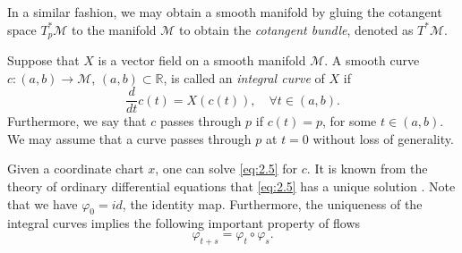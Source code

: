 In a similar fashion, we may obtain a smooth manifold by gluing the cotangent space $T^*_p \mathcal M$ to the manifold $\mathcal M$ to obtain the \emph{cotangent bundle}, denoted as $T^* \mathcal M$. 

\begin{definition}
Suppose that $X$ is a vector field on a smooth manifold $\mathcal M$. A smooth curve $c:(a,b)\to \mathcal M$, $(a,b)\subset \mathbb R$, is called an \emph{integral curve} of $X$ if
\begin{equation} \label{eq:2.5}
	\frac{d}{dt}c(t) = X(c(t)), \quad \forall t\in(a,b).
\end{equation}
Furthermore, we say that $c$ passes through $p$ if $c(t) = p$, for some $t\in(a,b)$. We may assume that a curve passes through $p$ at $t=0$ without loss of generality.
\end{definition}
Given a coordinate chart $x$, one can solve \eqref{eq:2.5} for $c$. It is known from the theory of ordinary differential equations that \eqref{eq:2.5} has a unique solution \cite{teschl2012ordinary}. 
Note that we have $\varphi_0 = id$, the identity map. Furthermore, the uniqueness of the integral curves implies the following important property of flows
\begin{equation} \label{eq:2.51}
	\varphi_{t+s} = \varphi_t \circ \varphi_s.
\end{equation}

